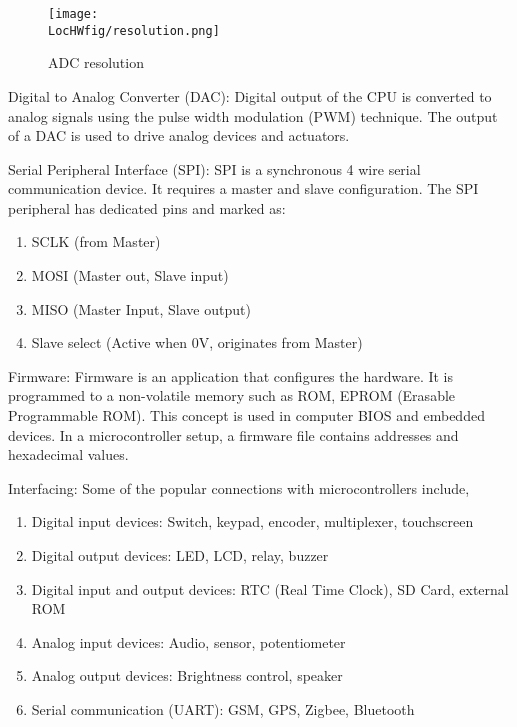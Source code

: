 \begin{description}
        \begin{figure}
          \centering
          \texttt{[image: \\LocHWfig/resolution.png]}
          \caption{ADC resolution}
          \label{resolution}
        \end{figure}

  \item {Digital to Analog Converter (DAC):} Digital output of the CPU is
        converted to analog signals using the pulse width modulation (PWM)
        technique. The output of a DAC is used to drive analog devices and actuators.

  \item {Serial Peripheral Interface (SPI):} SPI is a synchronous 4 wire
        serial communication device. It requires a master and slave
        configuration. The SPI peripheral has dedicated pins and marked
        as:
        \begin{enumerate}
          \item SCLK (from Master)
          \item MOSI (Master out, Slave input)
          \item MISO (Master Input, Slave output)
          \item Slave select (Active when 0V, originates from Master)
        \end{enumerate}

  \item {Firmware:} Firmware is an application that configures the
        hardware. It is programmed to a non-volatile memory such as ROM,
        EPROM (Erasable Programmable ROM). This concept is used in computer
        BIOS and embedded devices.  In a microcontroller setup, a firmware
        file contains addresses and hexadecimal values.

  \item{Interfacing:} Some of the popular connections with microcontrollers include,
        \begin{enumerate}
          \item Digital input devices: Switch, keypad, encoder, multiplexer,
                touchscreen
          \item Digital output devices: LED, LCD, relay, buzzer
          \item Digital input and output devices: RTC (Real Time Clock),
                SD Card, external ROM
          \item Analog input devices: Audio, sensor, potentiometer
          \item Analog output devices: Brightness control, speaker
          \item Serial communication (UART): GSM, GPS, Zigbee, Bluetooth
        \end{enumerate}
\end{description}

